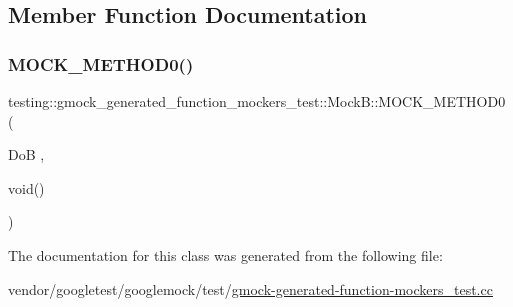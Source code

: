 \subsection{Member Function Documentation}
\mbox{\label{classtesting_1_1gmock__generated__function__mockers__test_1_1_mock_b_af0a5dcd462fc478e5e7a1ef503aafb05}} 
\subsubsection{\texorpdfstring{M\+O\+C\+K\+\_\+\+M\+E\+T\+H\+O\+D0()}{MOCK\_METHOD0()}}
{\footnotesize\ttfamily testing\+::gmock\+\_\+generated\+\_\+function\+\_\+mockers\+\_\+test\+::\+Mock\+B\+::\+M\+O\+C\+K\+\_\+\+M\+E\+T\+H\+O\+D0 (\begin{DoxyParamCaption}\item[{DoB}]{,  }\item[{void()}]{ }\end{DoxyParamCaption})}



The documentation for this class was generated from the following file\+:\begin{DoxyCompactItemize}
\item 
vendor/googletest/googlemock/test/\hyperlink{gmock-generated-function-mockers__test_8cc}{gmock-\/generated-\/function-\/mockers\+\_\+test.\+cc}\end{DoxyCompactItemize}
